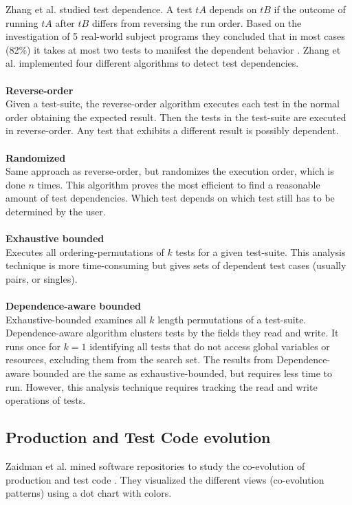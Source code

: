 \documentclass{uvamscse}
\newcommand{\ACoEvolution}{Zaidman et al.}
\newcommand{\AtestDependence}{Zhang et al.}
\begin{document}
\AtestDependence{} studied test dependence. A test $tA$ depends on $tB$ if the outcome of running $tA$ after $tB$ differs from reversing the run order. Based on the investigation of 5 real-world subject programs they concluded that in most cases (82\%) it takes at most two tests to manifest the dependent behavior \cite{zhang2014empirically}. \AtestDependence{} implemented four different algorithms to detect test dependencies. \\
\\
\textbf{Reverse-order}\\
Given a test-suite, the reverse-order algorithm executes each test in the normal order obtaining the expected result. Then the tests in the test-suite are executed in reverse-order. Any test that exhibits a different result is possibly dependent.\\
\\
\textbf{Randomized}\\
Same approach as reverse-order, but randomizes the execution order, which is done $n$ times. This algorithm proves the most efficient to find a reasonable amount of test dependencies. Which test depends on which test still has to be determined by the user. \\
\\
\textbf{Exhaustive bounded}\\
Executes all ordering-permutations of $k$ tests for a given test-suite. This analysis technique is more time-consuming but gives sets of dependent test cases (usually pairs, or singles). \\
\\
\textbf{Dependence-aware bounded}\\
Exhaustive-bounded examines all $k$ length permutations of a test-suite. Dependence-aware algorithm clusters tests by the fields they read and write. It runs once for $k = 1$ identifying all tests that do not access global variables or resources, excluding them from the search set. The results from Dependence-aware bounded are the same as exhaustive-bounded, but requires less time to run. However, this analysis technique requires tracking the read and write operations of tests.  

\subsection{Production and Test Code evolution}
\ACoEvolution{} mined software repositories to study the co-evolution of production and test code \cite{zaidman2008mining}. They visualized the different views (co-evolution patterns) using a dot chart with colors.
\end{document}
